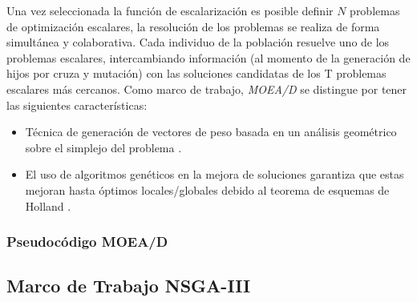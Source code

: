 \documentclass[letterpaper,10pt]{article}
\begin{document}
Una vez seleccionada la función de escalarización es posible definir $N$ problemas de optimización escalares, la resolución de los problemas se realiza de forma simultánea
y colaborativa. Cada individuo de la población resuelve uno de los problemas escalares, intercambiando información (al momento de la generación de hijos por cruza y mutación) con las soluciones candidatas de los T problemas escalares más cercanos.
Como marco de trabajo, \emph{MOEA/D} se distingue por tener las siguientes características:

 \begin{itemize}
 \item Técnica de generación de vectores de peso basada en un análisis geométrico sobre el simplejo del problema \cite{mie99,Das:1998:NIN:588907.589322, Messac2003}.
 \item El uso de algoritmos genéticos en la mejora de soluciones garantiza que estas mejoran hasta óptimos locales/globales debido al teorema de esquemas de Holland \cite{Holland:1992:ANA:531075}.
 \end{itemize}


\subsubsection{Pseudocódigo MOEA/D}


\subsection{Marco de Trabajo NSGA-III}
\end{document}
